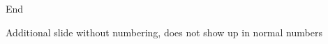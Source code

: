 
\begin{frame}[standout]
    \Huge
    End
\end{frame}

\appendix
\backupbegin



\begin{frame}[c]{Additional slide}
    without numbering, does not show up in normal numbers
\end{frame}



\backupend

